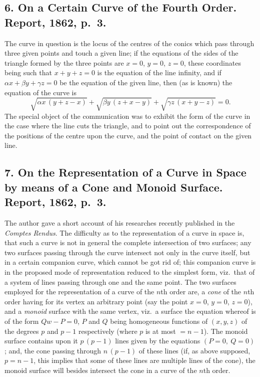 \documentclass[11pt,a4paper]{article}
\begin{document}
\subsection*{6. On a Certain Curve of the Fourth Order. Report, 1862, p.~3.}

The curve in question is the locus of the centres of the conics which pass
through three given points and touch a given line; if the equations of the sides of
the triangle formed by the three points are $x=0$, $y=0$, $z=0$, these coordinates being
such that $x+y+z=0$ is the equation of the line infinity, and if $\alpha x+\beta y+\gamma z=0$ be
the equation of the given line, then (as is known) the equation of the curve is
\[
\sqrt{\alpha x\,(y+z-x)} + \sqrt{\beta y\,(z+x-y)} + \sqrt{\gamma z\,(x+y-z)} = 0.
\]
The special object of the communication was to exhibit the form of the curve in
the case where the line cuts the triangle, and to point out the correspondence of the
positions of the centre upon the curve, and the point of contact on the given line.


\subsection*{7. On the Representation of a Curve in Space by means of a Cone and Monoid Surface. Report, 1862, p.~3.}

The author gave a short account of his researches recently published in the
\textit{Comptes Rendus}. The difficulty as to the representation of a curve in space is, that
such a curve is not in general the complete intersection of two surfaces; any two
surfaces passing through the curve intersect not only in the curve itself, but in a
certain companion curve, which cannot be got rid of; this companion curve is in the
proposed mode of representation reduced to the simplest form, viz.\ that of a system
of lines passing through one and the same point. The two surfaces employed for the
representation of a curve of the $n$th order are, a \textit{cone} of the $n$th order having for
its vertex an arbitrary point (say the point $x=0$, $y=0$, $z=0$), and a \textit{monoid} surface
with the same vertex, viz.\ a surface the equation whereof is of the form $Qw-P=0$,
$P$ and $Q$ being homogeneous functions of $(x, y, z)$ of the degrees $p$ and $p-1$
respectively (where $p$ is at most $=n-1$). The monoid surface contains upon it
$p\,(p-1)$ lines given by the equations $(P=0,\ Q=0)$; and, the cone passing through
$n\,(p-1)$ of these lines (if, as above supposed, $p=n-1$, this implies that some of
these lines are multiple lines of the cone), the monoid surface will besides intersect
the cone in a curve of the $n$th order.
\end{document}
